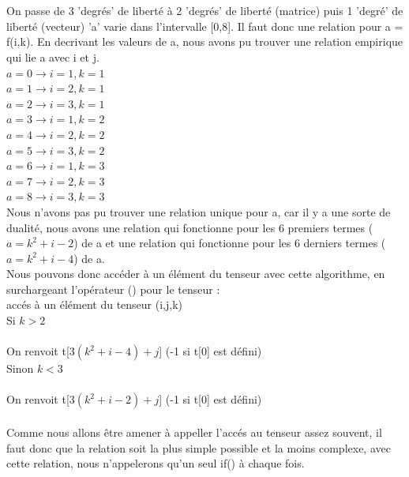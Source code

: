 \documentclass[a4paper,11pt,fleqn]{report}
\begin{document}
	\\\\On passe de 3 'degr\'es' de libert\'e \`a 2 'degr\'es' de libert\'e (matrice) puis 1 'degr\'e' de libert\'e (vecteur)
	'a' varie dans l'intervalle [0,8]. Il faut donc une relation pour a = f(i,k). En decrivant les valeurs de a, nous avons pu trouver une relation empirique qui lie a avec i et j.\\
	$a = 0 \to  i=1, k=1$\\
	$a = 1 \to  i=2, k=1$\\
	$a = 2 \to  i=3, k=1$\\
	$a = 3 \to  i=1, k=2$\\
	$a = 4 \to  i=2, k=2$\\
	$a = 5 \to  i=3, k=2$\\
	$a = 6 \to  i=1, k=3$\\
	$a = 7 \to  i=2, k=3$\\
	$a = 8 \to  i=3, k=3$\\
	Nous n'avons pas pu trouver une relation unique pour a, car il y a une sorte de dualit\'e, nous avons une relation qui fonctionne pour les 6 premiers termes ($ a = k^2 + i - 2$) de a et une relation qui fonctionne pour les 6 derniers termes ($ a = k^2 + i - 4 $) de a.
	\\
	Nous pouvons donc acc\'eder \`a un \'el\'ement du tenseur avec cette algorithme, en surchargeant l'op\'erateur () pour le tenseur :
	\\acc\'es \`a un \'el\'ement du tenseur (i,j,k)
	\\Si $k > 2$\\\\On renvoit t[$3(k^2 + i - 4) + j $]   (-1 si t[0] est d\'efini)
	\\Sinon $k < 3$\\\\On renvoit t[$3(k^2 + i - 2) + j $]   (-1 si t[0] est d\'efini)
	\\\\Comme nous allons \^etre amener \`a appeller l'acc\'es au tenseur assez souvent, il faut donc que la relation soit la plus simple possible et la moins complexe, avec cette relation, nous n'appelerons qu'un seul if() \`a chaque fois.
	\\
	\\
	\\
\end{document}
